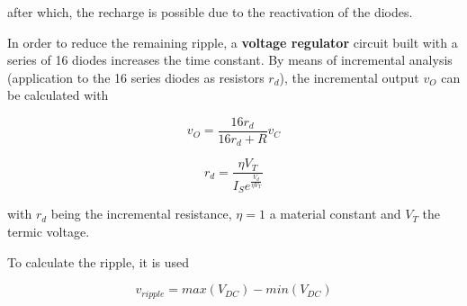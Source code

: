 after which, the recharge is possible due to the reactivation of the diodes.
\par

In order to reduce the remaining ripple, a \textbf{voltage regulator} circuit built with a series of 16 diodes increases the time constant. By means of incremental analysis (application to the 16 series diodes as resistors $r_d$), the incremental output $v_O$ can be calculated with

\begin{equation}
  v_O=\frac{16r_d}{16r_d+R}v_C
\end{equation}

\begin{equation}
  r_d=\frac{\eta V_T}{I_Se^{\frac{V_d}{\eta V_T}}}
\end{equation}

with $r_d$ being the incremental resistance, $\eta=1$ a material constant and $V_T$ the termic voltage.

\par

To calculate the ripple, it is used

\begin{equation}
 v_{ripple}=max(V_{DC})-min(V_{DC})
\end{equation}

\vspace{100mm}

